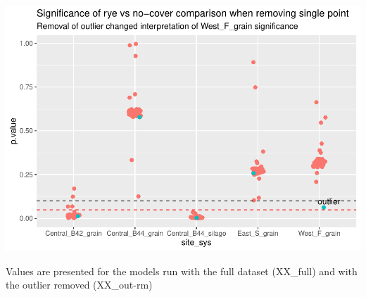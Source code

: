 \documentclass[
]{article}
\begin{document}
\includegraphics{supp-mat_files/figure-latex/loo-1.pdf}

Values are presented for the models run with the full dataset (XX\_full)
and with the outlier removed (XX\_out-rm)
\end{document}
